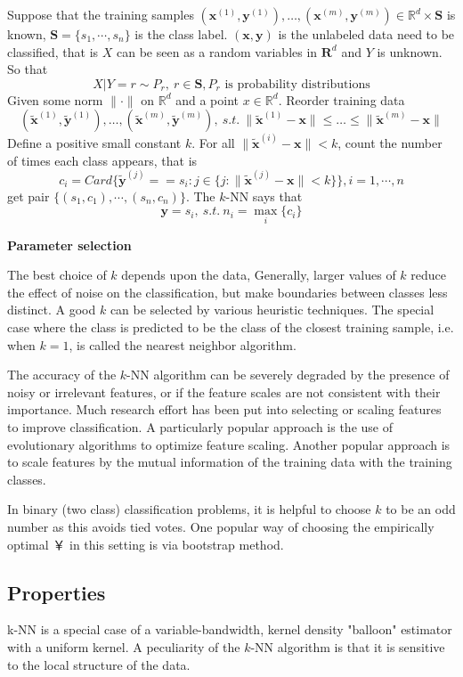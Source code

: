 Suppose that the training samples $(\boldsymbol x ^{(1)},\boldsymbol y ^{(1)}),\dots,(\boldsymbol x ^{(m)},\boldsymbol y ^{(m)})\in \mathbb{R}^{d}\times \mathbf{S}$ is known, $\mathbf{S} = \{s_1,\cdots,s_n\}$ is the class label. $(\boldsymbol x,\boldsymbol y)$ is the unlabeled data need to be classified, that is $X$ can be seen as a random variables in $\mathbf{R}^d$ and $Y$ is unknown. So that
 \[
 	X|Y=r\sim P_{r},~r\in\mathbf{S},P_{r} \text{ is probability distributions}
 \] 
Given some norm $\|\cdot \|$ on $\mathbb {R}^{d}$ and a point $x\in {\mathbb{R}}^{d}$. Reorder training data
 \[
 	(\tilde{\boldsymbol x} ^{(1)},\tilde{\boldsymbol y} ^{(1)}),\dots ,(\tilde{\boldsymbol x} ^{(m)},\tilde{\boldsymbol y} ^{(m)}),~s.t.~\|\tilde{\boldsymbol x} ^{(1)}-\boldsymbol x\|\leq \dots \leq \|\tilde{\boldsymbol x} ^{(m)}-\boldsymbol x\|
 \]
Define a positive small constant $k$. For all $\|\tilde{\boldsymbol x}^{(i)} - \boldsymbol x\| <k $, count the number of times each class appears, that is 
\[
	c_i=Card\{\tilde{\boldsymbol y}^{(j)} == s_i: j\in\{j:\|\tilde{\boldsymbol x}^{(j)} - \boldsymbol x\| <k\}\}, i=1,\cdots, n
\]
get pair $\{(s_1,c_1),\cdots,(s_n,c_n)\}$. The $k$-NN says that 
\[
	\boldsymbol y = s_i,~s.t.~n_i=\max_{i}\{c_i\}
\]

\noindent\textbf{Parameter selection}

The best choice of $k$ depends upon the data, Generally, larger values of $k$ reduce the effect of noise on the classification, but make boundaries between classes less distinct. A good $k$ can be selected by various heuristic techniques. The special case where the class is predicted to be the class of the closest training sample, i.e. when $k = 1$, is called the nearest neighbor algorithm.

The accuracy of the $k$-NN algorithm can be severely degraded by the presence of noisy or irrelevant features, or if the feature scales are not consistent with their importance. Much research effort has been put into selecting or scaling features to improve classification. A particularly popular approach is the use of evolutionary algorithms to optimize feature scaling. Another popular approach is to scale features by the mutual information of the training data with the training classes.

In binary (two class) classification problems, it is helpful to choose $k$ to be an odd number as this avoids tied votes. One popular way of choosing the empirically optimal ￥ in this setting is via bootstrap method.


\subsection{Properties}
k-NN is a special case of a variable-bandwidth, kernel density "balloon" estimator with a uniform kernel. A peculiarity of the $k$-NN algorithm is that it is sensitive to the local structure of the data.

